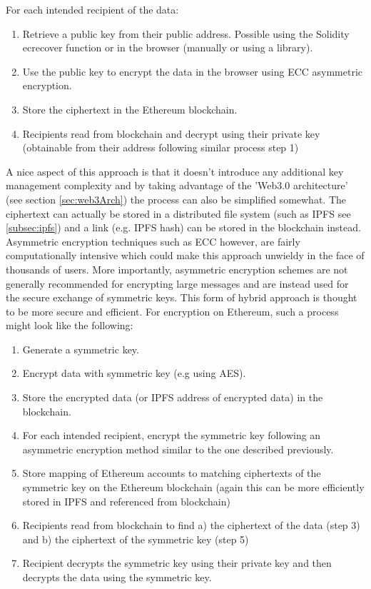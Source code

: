 For each intended recipient of the data:\\
\begin{enumerate}
\item Retrieve a public key from their public address. Possible using the Solidity ecrecover function\cite{SolidityCheatsheet} or in the browser (manually\cite{StackExchangeAddress} or using a library\cite{WalletJS}).

\item Use the public key to encrypt the data in the browser using ECC asymmetric encryption.

\item Store the ciphertext in the Ethereum blockchain.

\item Recipients read from blockchain and decrypt using their private key (obtainable from their address following similar process step 1) 

\end{enumerate}

A nice aspect of this approach is that it doesn't introduce any additional key management complexity and by taking advantage of the 'Web3.0 architecture' (see section \ref{sec:web3Arch}) the process can also be simplified somewhat. The ciphertext can actually be stored in a distributed file system (such as IPFS see  \ref{subsec:ipfs}) and a link (e.g. IPFS hash) can be stored in the blockchain instead. \\

Asymmetric encryption techniques such as ECC however, are fairly computationally intensive which could make this approach unwieldy in the face of thousands of users. More importantly, asymmetric encryption schemes are not generally recommended for encrypting large messages and are instead used for the secure exchange of symmetric keys. This form of hybrid approach is thought to be more secure and efficient. For encryption on Ethereum, such a process might look like the following:

\begin{enumerate}
\item Generate a symmetric key. 
\item Encrypt data with symmetric key (e.g using AES).
\item Store the encrypted data (or IPFS address of encrypted data) in the blockchain.
\item For each intended recipient, encrypt the symmetric key following an asymmetric encryption method similar to the one described previously.
\item Store mapping of Ethereum accounts to matching ciphertexts of the symmetric key on the Ethereum blockchain (again this can be more efficiently stored in IPFS and referenced from blockchain)
\item Recipients read from blockchain to find a) the ciphertext of the data (step 3) and b) the ciphertext of the symmetric key (step 5)
\item Recipient decrypts the symmetric key using their private key and then decrypts the data using the symmetric key.
\end{enumerate}


